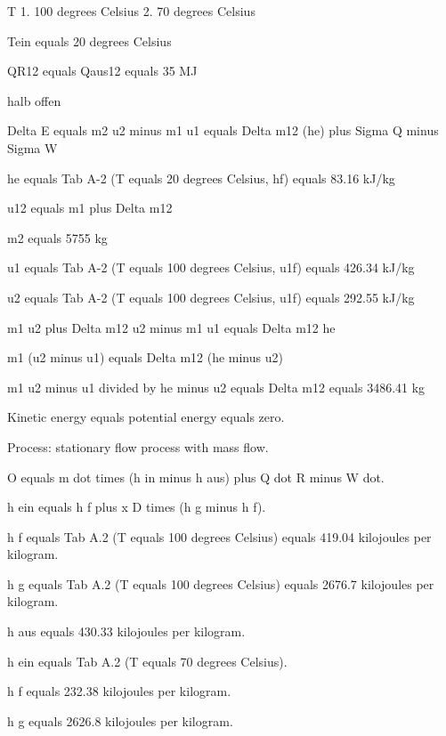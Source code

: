 T  
1. 100 degrees Celsius  
2. 70 degrees Celsius  

Tein equals 20 degrees Celsius  

QR12 equals Qaus12 equals 35 MJ  

halb offen  

Delta E equals m2 u2 minus m1 u1 equals Delta m12 (he) plus Sigma Q minus Sigma W  

he equals Tab A-2 (T equals 20 degrees Celsius, hf) equals 83.16 kJ/kg  

u12 equals m1 plus Delta m12  

m2 equals 5755 kg  

u1 equals Tab A-2 (T equals 100 degrees Celsius, u1f) equals 426.34 kJ/kg  

u2 equals Tab A-2 (T equals 100 degrees Celsius, u1f) equals 292.55 kJ/kg  

m1 u2 plus Delta m12 u2 minus m1 u1 equals Delta m12 he  

m1 (u2 minus u1) equals Delta m12 (he minus u2)  

m1 u2 minus u1 divided by he minus u2 equals Delta m12 equals 3486.41 kg

Kinetic energy equals potential energy equals zero.

Process: stationary flow process with mass flow.

O equals m dot times (h in minus h aus) plus Q dot R minus W dot.

h ein equals h f plus x D times (h g minus h f).

h f equals Tab A.2 (T equals 100 degrees Celsius) equals 419.04 kilojoules per kilogram.

h g equals Tab A.2 (T equals 100 degrees Celsius) equals 2676.7 kilojoules per kilogram.

h aus equals 430.33 kilojoules per kilogram.

h ein equals Tab A.2 (T equals 70 degrees Celsius).

h f equals 232.38 kilojoules per kilogram.

h g equals 2626.8 kilojoules per kilogram.